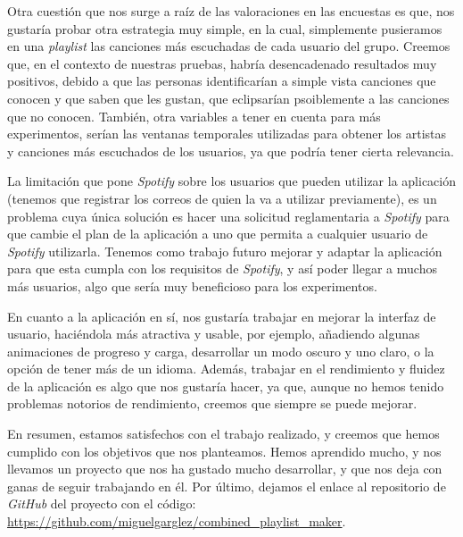 Otra cuestión que nos surge a raíz de las valoraciones en las encuestas es que, nos gustaría probar otra estrategia muy simple, en la cual, simplemente pusieramos en una \textit{playlist} las canciones más escuchadas
de cada usuario del grupo. Creemos que, en el contexto de nuestras pruebas, habría desencadenado resultados muy positivos, debido a que las personas identificarían a simple vista canciones que conocen y que saben que les gustan, que 
eclipsarían psoiblemente a las canciones que no conocen. También, otra variables a tener en cuenta para más experimentos, serían las ventanas temporales utilizadas para obtener los artistas y canciones más escuchados de los usuarios, 
ya que podría tener cierta relevancia.

La limitación que pone \textit{Spotify} sobre los usuarios que pueden utilizar la aplicación (tenemos que registrar los correos de quien la va a utilizar previamente), es un problema cuya única solución es hacer una solicitud 
reglamentaria a \textit{Spotify} para que cambie el plan de la aplicación a uno que permita a cualquier usuario de \textit{Spotify} utilizarla. Tenemos como trabajo futuro mejorar y adaptar la aplicación para que esta cumpla con 
los requisitos de \textit{Spotify}, y así poder llegar a muchos más usuarios, algo que sería muy beneficioso para los experimentos.

En cuanto a la aplicación en sí, nos gustaría trabajar en mejorar la interfaz de usuario, haciéndola más atractiva y usable, por ejemplo, añadiendo algunas animaciones de progreso y carga, desarrollar un modo oscuro y uno claro,
o la opción de tener más de un idioma. Además, trabajar en el rendimiento y fluidez de la aplicación es algo que nos gustaría hacer, ya que, aunque no hemos tenido problemas notorios de rendimiento, creemos que siempre se puede mejorar.

En resumen, estamos satisfechos con el trabajo realizado, y creemos que hemos cumplido con los objetivos que nos planteamos. Hemos aprendido mucho, y nos llevamos un proyecto que nos ha gustado mucho desarrollar, 
y que nos deja con ganas de seguir trabajando en él. Por último, dejamos el enlace al repositorio de \textit{GitHub} del proyecto con el código: \url{https://github.com/miguelgarglez/combined_playlist_maker}.